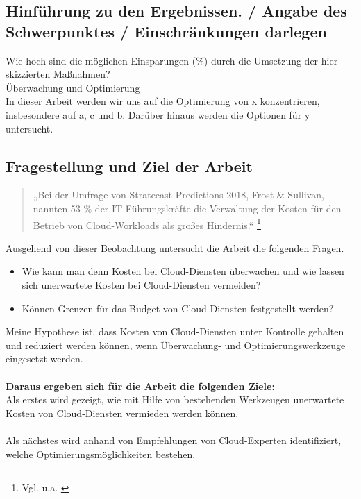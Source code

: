 \subsection{Hinführung zu den Ergebnissen. / Angabe des Schwerpunktes / Einschränkungen darlegen}
Wie hoch sind die möglichen Einsparungen (\%) durch die Umsetzung der hier skizzierten Maßnahmen?
\\
Überwachung und Optimierung
\\
In dieser Arbeit werden wir uns auf die Optimierung von x konzentrieren, insbesondere auf a, c und b. Darüber hinaus werden die Optionen für y untersucht.
\\
\subsection{Fragestellung und Ziel der Arbeit}
\begin{quote}
„Bei der Umfrage von Stratecast Predictions 2018, Frost \& Sullivan, nannten 53 \% der IT-Führungskräfte die Verwaltung der Kosten für den Betrieb von Cloud-Workloads als großes Hindernis.“  
\footnote{Vgl. u.a. \cite{SP1}}
\end{quote}
Ausgehend von dieser Beobachtung untersucht die Arbeit die folgenden Fragen. 
\begin{itemize}
    \item
        Wie kann man denn Kosten bei Cloud-Diensten überwachen und wie lassen sich unerwartete Kosten bei Cloud-Diensten vermeiden? 
    \item
        Können Grenzen für das Budget von Cloud-Diensten festgestellt werden?
\end{itemize}
Meine Hypothese ist, dass Kosten von Cloud-Diensten unter Kontrolle gehalten und
reduziert werden können, wenn Überwachung- und Optimierungswerkzeuge eingesetzt werden.
\\\\
\textbf{Daraus ergeben sich für die Arbeit die folgenden Ziele:}\\ 
Als erstes wird gezeigt, wie mit Hilfe von bestehenden Werkzeugen unerwartete Kosten von Cloud-Diensten vermieden werden können.\\\\
Als nächstes wird anhand von Empfehlungen von Cloud-Experten identifiziert, welche Optimierungsmöglichkeiten bestehen.\\
\newpage
